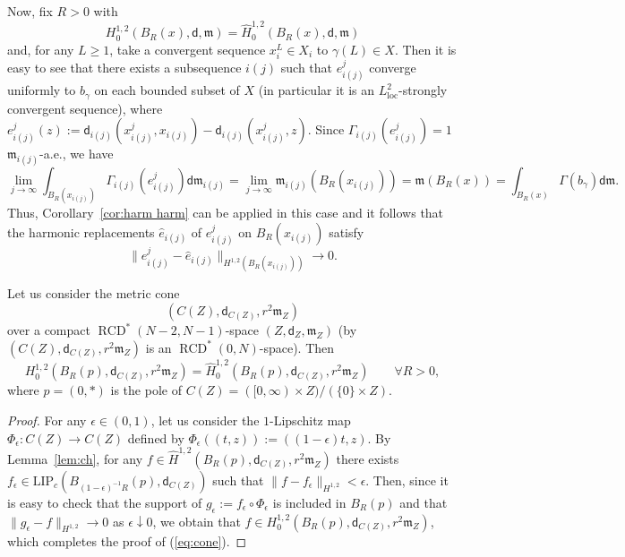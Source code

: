 \documentclass[a4paper,11pt,reqno]{article}
\numberwithin{equation}{section}
\theoremstyle{plain}
\theoremstyle{definition}
\theoremstyle{remark}
\newcommand{\dist}{\mathsf{d}}
\newcommand{\meas}{\mathfrak{m}}
\DeclareMathOperator{\RCD}{RCD}
\begin{document}
{\begin{remark}
Now, fix $R>0$ with 
$$
H^{1, 2}_0(B_R(x), \dist, \meas)=\hat{H}^{1, 2}_0(B_R(x), \dist, \meas)
$$
and, for any $L \ge 1$, take a convergent sequence $x_i^L \in X_i$ to $\gamma (L) \in X$.
Then it is easy to see that there exists a subsequence $i(j)$ such that $e_{i(j)}^j$ converge 
uniformly to $b_{\gamma}$ on each bounded subset of $X$ (in particular it is an $L^2_{\mathrm{loc}}$-strongly convergent
sequence), where 
$e_{i(j)}^j(z):=\dist_{i(j)}(x_{i(j)}^j, x_{i(j)})-\dist_{i(j)}(x_{i(j)}^j, z)$.
Since $\Gamma_{i(j)}(e_{i(j)}^j)=1$ $\meas_{i(j)}$-a.e., we have
$$
\lim_{j \to \infty}\int_{B_R(x_{i(j)})}\Gamma_{i(j)}( e_{i(j)}^j)\dist \meas_{i(j)}=\lim_{j \to \infty}\meas_{i(j)}(B_R(x_{i(j)}))=\meas (B_R(x))
=\int_{B_R(x)}\Gamma(b_{\gamma})\dist \meas.
$$
Thus, Corollary~\ref{cor:harm harm} can be applied in this case and it follows that
the harmonic replacements $\hat{e}_{i(j)}$ of $e_{i(j)}^j$ on $B_R(x_{i(j)})$ satisfy 
$$
\|e_{i(j)}^j-\hat{e}_{i(j)}\|_{H^{1, 2}(B_R(x_{i(j)}))} \to 0.
$$\end{remark}



\begin{proposition}\label{prop:cone sobolev}
Let us consider the metric cone
$$
(C(Z), \dist_{C(Z)}, r^2\meas_Z)
$$
over a compact $\RCD^*(N-2,N-1)$-space $(Z, \dist_Z, \meas_Z)$
(by \cite{Ketterer15a} $(C(Z), \dist_{C(Z)}, r^2\meas_Z)$ is an $\RCD^*(0, N)$-space).
Then 
\begin{equation}\label{eq:cone}
H^{1, 2}_0(B_R(p), \dist_{C(Z)}, r^2\meas_Z) =\hat{H}^{1, 2}_0(B_R(p), \dist_{C(Z)}, r^2\meas_Z)\qquad\forall R>0,
\end{equation}
where $p=(0, *)$ is the pole of $C(Z)=([0, \infty) \times Z)/(\{0\} \times Z)$.
\end{proposition}
\begin{proof}
For any $\epsilon \in (0, 1)$, let us consider the $1$-Lipschitz map $\Phi_{\epsilon}: C(Z) \to C(Z)$ defined by $\Phi_{\epsilon}((t, z)):=((1-\epsilon)t, z)$.
By Lemma~\ref{lem:ch}, for any $f \in \hat{H}^{1, 2}(B_R(p), \dist_{C(Z)}, r^2\meas_Z)$ there exists $f_{\epsilon} \in \mathrm{LIP}_c(B_{(1-\epsilon)^{-1}R}(p), \dist_{C(Z)})$ such that $\|f-f_{\epsilon}\|_{H^{1, 2}}<\epsilon$.
Then, since it is easy to check that the support of $g_{\epsilon}:=f_{\epsilon} \circ \Phi_{\epsilon}$ is included in $B_R(p)$ and that $\|g_{\epsilon} - f\|_{H^{1, 2}} \to 0$ as $\epsilon \downarrow 0$, we obtain that $f \in H^{1, 2}_0(B_R(p), \dist_{C(Z)}, r^2\meas_Z)$, which completes the proof of (\ref{eq:cone}). 
\end{proof}

}
\end{document}

